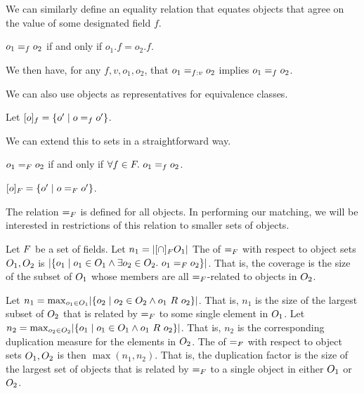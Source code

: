 We can similarly define an equality relation that equates objects that
agree on the value of some designated field $f$.
\begin{defn}
$o_1 \eqf{f} o_2$ if and only if $o_1.f = o_2.f$.
\end{defn}
We then have, for any $f,v,o_1,o_2$, that $o_1 \eqfv{f}{v} o_2$
implies $o_1 \eqf{f} o_2$.

We can also use objects as representatives for equivalence classes.
\begin{defn}
Let $\eqfclass{f}{o} = \{o' \mid o \eqf{f} o'\}$.
\end{defn}

We can extend this to sets in a straightforward way.
\begin{defn}
$o_1 \eqf{\fset} o_2$ if and only if $\A[f \in \fset] o_1 \eqf{f} o_2$.
\end{defn}
\begin{defn}
$\eqfclass{\fset}{o} = \{o' \mid o \eqf{\fset} o'\}$.
\end{defn}



The relation $\eqf{\fset}$ is defined for all objects.  In performing
our matching, we will be interested in restrictions of this relation
to smaller sets of objects.
\begin{defn}
Let $\fset$ be a set of fields.
Let $n_1 = \setsize{\eqfclass{\fset} \cap \objset_1}$
The  of $\eqf{\fset}$ with respect to object sets
$\objset_1, \objset_2$ is $\setsize{\{o_1 \mid o_1 \in \objset_1
  \wedge \E[o_2 \in \objset_2] o_1 \eqf{\fset} o_2\}}$.  That is, the
coverage is the size of the subset of $\objset_1$ whose members are
all $\eqf{\fset}$-related to objects in $\objset_2$.
\end{defn}
\begin{defn}
Let $n_1 = \max_{o_1 \in \objset_1}\setsize{\{o_2 \mid o_2 \in
  \objset_2 \wedge o_1\ R\ o_2\}}$.  That is, $n_1$ is the size of the
largest subset of $\objset_2$ that is related by $\eqf{\fset}$ to some
single element in $\objset_1$.  Let $n_2 = \max_{o_2 \in
  \objset_2}\setsize{\{o_1 \mid o_1 \in \objset_1 \wedge
  o_1\ R\ o_2\}}$.  That is, $n_2$ is the corresponding duplication
measure for the elements in $\objset_2$.
The  of $\eqf{\fset}$ with respect to
object sets $\objset_1, \objset_2$ is then $\max(n_1,n_2)$.  That is,
the duplication factor is the size of the largest set of objects that
is related by $\eqf{\fset}$ to a single object in either $\objset_1$
or $\objset_2$.
\end{defn}

